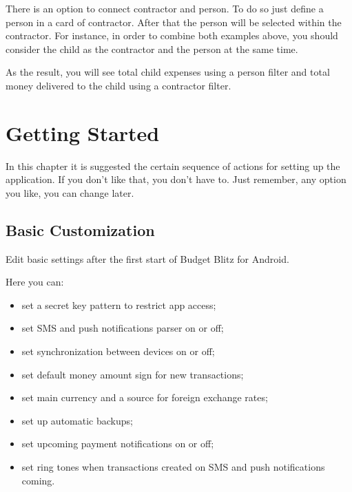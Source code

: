 \documentclass[a4paper,10pt,english]{sphinxmanual}
\begin{document}
There is an option to connect contractor and person. To do so just define a person in a card
of contractor. After that the person will be selected within the contractor. For instance, in order
to combine both examples above, you should consider the child as the contractor and the person at the same time.

As the result, you will see total child expenses using a person filter and total
money delivered to the child using a contractor filter.


\chapter{Getting Started}
\label{\detokenize{getting-started:getting-started}}\label{\detokenize{getting-started::doc}}
In this chapter it is suggested the certain sequence of actions for setting up the application.
If you don’t like that, you don’t have to.  Just remember, any option you like, you can change later.


\section{Basic Customization}
\label{\detokenize{getting-started:basic-customization}}
Edit basic settings after the first start of Budget Blitz for Android.

\noindent{}
\noindent{}
\noindent{}

Here you can:
\begin{itemize}
\item {} 
set a secret key pattern to restrict app access;

\item {} 
set SMS and push notifications parser on or off;

\item {} 
set synchronization between devices on or off;

\item {} 
set default money amount sign for new transactions;

\item {} 
set main currency and a source for foreign exchange rates;

\item {} 
set up automatic backups;

\item {} 
set upcoming payment notifications on or off;

\item {} 
set ring tones when transactions created on SMS and push notifications coming.

\end{itemize}
\end{document}
